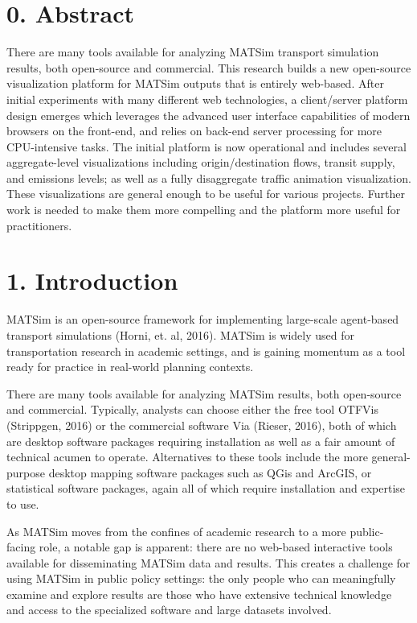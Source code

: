 \hypertarget{mathub-abstract}{%
\section{0. Abstract}\label{mathub-abstract}}

There are many tools available for analyzing MATSim transport simulation results, both open-source and commercial. This research builds a new open-source visualization platform for MATSim outputs that is entirely web-based. After initial experiments with many different web technologies, a client/server platform design emerges which leverages the advanced user interface capabilities of modern browsers on the front-end, and relies on back-end server processing for more CPU-intensive tasks. The initial platform is now operational and includes several aggregate-level visualizations including origin/destination flows, transit supply, and emissions levels; as well as a fully disaggregate traffic animation visualization. These visualizations are general enough to be useful for various projects. Further work is needed to make them more compelling and the platform more useful for practitioners.

\hypertarget{introduction}{%
\section{1. Introduction}\label{introduction}}

MATSim is an open-source framework for implementing large-scale agent-based transport simulations (Horni, et. al, 2016). MATSim is widely used for transportation research in academic settings, and is gaining momentum as a tool ready for practice in real-world planning contexts.

There are many tools available for analyzing MATSim results, both open-source and commercial. Typically, analysts can choose either the free tool OTFVis (Strippgen, 2016) or the commercial software Via (Rieser, 2016), both of which are desktop software packages requiring installation as well as a fair amount of technical acumen to operate. Alternatives to these tools include the more general-purpose desktop mapping software packages such as QGis and ArcGIS, or statistical software packages, again all of which require installation and expertise to use.

As MATSim moves from the confines of academic research to a more public-facing role, a notable gap is apparent: there are no web-based interactive tools available for disseminating MATSim data and results. This creates a challenge for using MATSim in public policy settings: the only people who can meaningfully examine and explore results are those who have extensive technical knowledge and access to the specialized software and large datasets involved.

